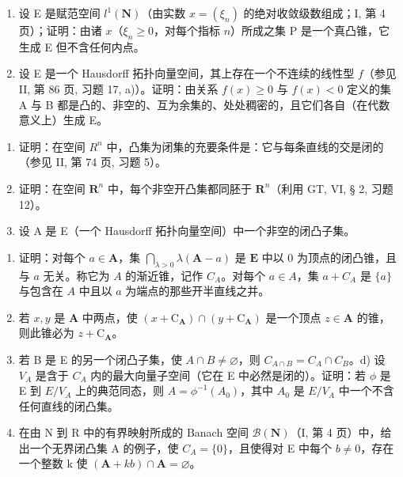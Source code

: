 \begin{enumerate}
\def\labelenumi{\alph{enumi})}
\setcounter{enumi}{1}
\item
  设 E 是赋范空间 \(l^1(\mathbf{N})\)（由实数 \(x = (\xi_n)\) 的绝对收敛级数组成；I, 第 4 页）；证明：由诸 \(x\)（\(\xi_n \geqslant 0\)，对每个指标 \(n\)）所成之集 P 是一个真凸锥，它生成 E 但不含任何内点。
\item
  设 E 是一个 Hausdorff 拓扑向量空间，其上存在一个不连续的线性型 \(f\)（参见 II, 第 86 页, 习题 17, a)）。证明：由关系 \(f(x) \geqslant 0\) 与 \(f(x) < 0\) 定义的集 A 与 B 都是凸的、非空的、互为余集的、处处稠密的，且它们各自（在代数意义上）生成 E。
\end{enumerate}

\begin{enumerate}
\def\labelenumi{\arabic{enumi})}
\setcounter{enumi}{11}
\item
  证明：在空间 \(R^{n}\) 中，凸集为闭集的充要条件是：它与每条直线的交是闭的（参见 II, 第 74 页, 习题 5）。
\item
  证明：在空间 \(\mathbf{R}^n\) 中，每个非空开凸集都同胚于 \(\mathbf{R}^n\)（利用 GT, VI, § 2, 习题 12）。
\item
  设 A 是 E（一个 Hausdorff 拓扑向量空间）中一个非空的闭凸子集。
\end{enumerate}

\begin{enumerate}
\def\labelenumi{\alph{enumi})}
\item
  证明：对每个 \(a \in \mathbf{A}\)，集 \(\bigcap_{\lambda > 0} \lambda(\mathbf{A} - a)\) 是 \(\mathbf{E}\) 中以 0 为顶点的闭凸锥，且与 \(a\) 无关。称它为 \(A\) 的渐近锥，记作 \(C_A\)。对每个 \(a \in A\)，集 \(a + C_A\) 是 \(\{a\}\) 与包含在 \(A\) 中且以 \(a\) 为端点的那些开半直线之并。
\item
  若 \(x, y\) 是 \(\mathbf{A}\) 中两点，使 \((x + \mathrm{C}_{\mathbf{A}}) \cap (y + \mathrm{C}_{\mathbf{A}})\) 是一个顶点 \(z \in \mathbf{A}\) 的锥，则此锥必为 \(z + \mathrm{C}_{\mathbf{A}}\)。
\item
  若 B 是 E 的另一个闭凸子集，使 \(A \cap B \neq \varnothing\)，则 \(C_{A \cap B} = C_{A} \cap C_{B}\)。d) 设 \(V_{A}\) 是含于 \(C_{A}\) 内的最大向量子空间（它在 E 中必然是闭的）。证明：若 \(\phi\) 是 E 到 \(E/V_{A}\) 上的典范同态，则 \(A = \phi^{-1}(A_{0})\)，其中 \(A_{0}\) 是 \(E/V_{A}\) 中一个不含任何直线的闭凸集。
\item
  在由 N 到 R 中的有界映射所成的 Banach 空间 \(\mathcal{B}(\mathbf{N})\)（I, 第 4 页）中，给出一个无界闭凸集 A 的例子，使 \(C_{A} = \{0\}\)，且使得对 E 中每个 \(b \neq 0\)，存在一个整数 k 使 \((\mathbf{A} + kb) \cap \mathbf{A} = \varnothing\)。
\end{enumerate}

